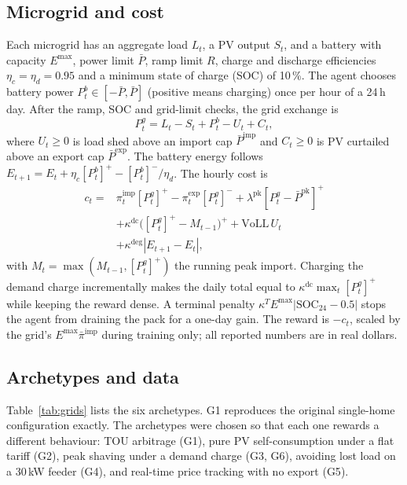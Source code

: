 \documentclass[conference]{IEEEtran}
\newcommand{\G}[1]{\textsf{#1}}
\begin{document}
\subsection{Microgrid and cost}
Each microgrid has an aggregate load $L_t$, a PV output $S_t$, and a battery with
capacity $E^{\max}$, power limit $\bar P$, ramp limit $R$, charge and discharge
efficiencies $\eta_c=\eta_d=0.95$ and a minimum state of charge (SOC) of 10\,\%. The agent chooses battery
power $P^b_t\in[-\bar P,\bar P]$ (positive means charging) once per hour of a
24\,h day. After the ramp, SOC and grid-limit checks, the grid exchange is
\begin{equation}
P^g_t = L_t - S_t + P^b_t - U_t + C_t ,
\end{equation}
where $U_t\ge 0$ is load shed above an import cap $\bar P^{\mathrm{imp}}$ and
$C_t\ge 0$ is PV curtailed above an export cap $\bar P^{\mathrm{exp}}$. The battery energy follows
$E_{t+1}=E_t+\eta_c[P^b_t]^+ - [P^b_t]^-/\eta_d$. The hourly cost is
\begin{align}
c_t ={}& \pi^{\mathrm{imp}}_t [P^g_t]^+ - \pi^{\mathrm{exp}}_t [P^g_t]^-
 + \lambda^{\mathrm{pk}} [P^g_t-\bar P^{\mathrm{pk}}]^+ \nonumber\\
 &+ \kappa^{\mathrm{dc}}\big([P^g_t]^+ - M_{t-1}\big)^+ + \mathrm{VoLL}\,U_t \nonumber\\
 &+ \kappa^{\mathrm{deg}} |E_{t+1}-E_t| ,
\end{align}
with $M_t=\max(M_{t-1},[P^g_t]^+)$ the running peak import. Charging the demand
charge incrementally makes the daily total equal to
$\kappa^{\mathrm{dc}}\max_t [P^g_t]^+$ while keeping the reward dense. A terminal
penalty $\kappa^{T}E^{\max}|\mathrm{SOC}_{24}-0.5|$ stops the agent from draining
the pack for a one-day gain. The reward is $-c_t$, scaled by the grid's
$E^{\max}\bar\pi^{\mathrm{imp}}$ during training only; all reported numbers are in
real dollars.

\subsection{Archetypes and data}
Table~\ref{tab:grids} lists the six archetypes. \G{G1} reproduces the original
single-home configuration exactly. The archetypes were chosen so that each one
rewards a different behaviour: TOU arbitrage (\G{G1}), pure PV
self-consumption under a flat tariff (\G{G2}), peak shaving under a demand
charge (\G{G3}, \G{G6}), avoiding lost load on a 30\,kW feeder (\G{G4}), and
real-time price tracking with no export (\G{G5}).
\end{document}
